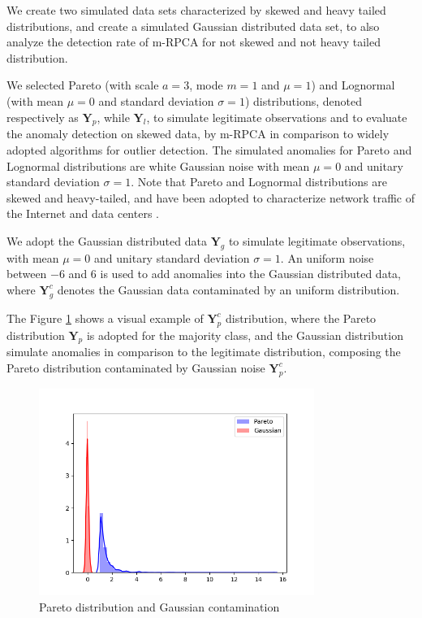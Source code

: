 \documentclass[review]{elsarticle}
\begin{document}
We create two simulated data sets characterized by skewed and heavy tailed distributions, and create a simulated Gaussian distributed data set, to also analyze the detection rate of m-RPCA for not skewed and not heavy tailed distribution.

We selected Pareto (with scale $a=3$, mode $m=1$ and $\mu=1$) and Lognormal (with mean $\mu=0$ and standard deviation $\sigma=1$) distributions, denoted respectively as $\pmb{Y}_p$, while $\pmb{Y}_l$, to simulate legitimate observations and to evaluate the anomaly detection on skewed data, by m-RPCA in comparison to widely adopted algorithms for outlier detection. The simulated anomalies for Pareto and Lognormal distributions are white Gaussian noise with mean $\mu=0$ and unitary standard deviation $\sigma=1$. Note that Pareto and Lognormal distributions are skewed and heavy-tailed, and have been adopted to characterize network traffic of the Internet and data centers \cite{benson2010network,leon2017probability}. 

We adopt the Gaussian distributed data $\pmb{Y}_g$ to simulate legitimate observations, with mean $\mu=0$ and unitary standard deviation $\sigma=1$. An uniform noise between $-6$ and $6$ is used to add anomalies into the Gaussian distributed data, where $\pmb{Y}_g^c$ denotes the Gaussian data contaminated by an uniform distribution. 

The Figure \ref{fig:4.01} shows a visual example of $\pmb{Y}_p^c$ distribution, where the Pareto distribution $\pmb{Y}_p$ is adopted for the majority class, and the Gaussian distribution simulate anomalies in comparison to the legitimate distribution, composing the Pareto distribution contaminated by Gaussian noise $\pmb{Y}_p^c$.

\begin{figure}[!htb]
	\centering
	\includegraphics[width=0.8\textwidth]{figures/4_Xpg2.png}
	\caption{Pareto distribution and Gaussian contamination}
	\label{fig:4.01}
\end{figure}
\end{document}
